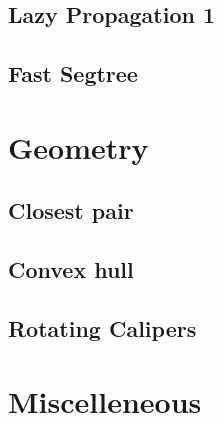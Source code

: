 \documentclass[10pt,landscape,a4paper,twocolumn]{article}
\begin{document}
\subsection{Lazy Propagation 1}


\subsection{Fast Segtree}


\section{Geometry}
\subsection{Closest pair}


\subsection{Convex hull}


\subsection{Rotating Calipers}



\section{Miscelleneous}
%
%
%
%
%
%
%
\end{document}
